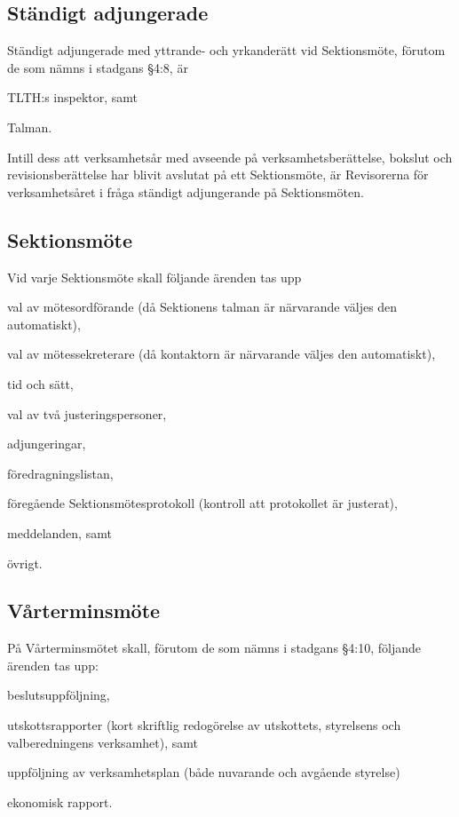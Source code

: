 \documentclass[10pt]{article}
\begin{document}
\subsection{Ständigt adjungerade}
Ständigt adjungerade med yttrande- och yrkanderätt vid Sektionsmöte,
förutom de som nämns i stadgans §4:8, är

\begin{alphlist}
    \item TLTH:s inspektor, samt
    \item Talman.
\end{alphlist}

Intill dess att verksamhetsår med avseende på verksamhetsberättelse,
bokslut och revisionsberättelse har blivit avslutat på ett Sektionsmöte,
är Revisorerna för verksamhetsåret i fråga ständigt adjungerande på
Sektionsmöten.

\subsection{Sektionsmöte}
Vid varje Sektionsmöte skall följande ärenden tas upp

\begin{alphlist}
    \item val av mötesordförande (då Sektionens talman är närvarande
        väljes den automatiskt),
    \item val av mötessekreterare (då kontaktorn är närvarande väljes
        den automatiskt),
    \item tid och sätt,
    \item val av två justeringspersoner,
    \item adjungeringar,
    \item föredragningslistan,
    \item föregående Sektionsmötesprotokoll (kontroll att protokollet
        är justerat),
    \item meddelanden, samt
    \item övrigt.
\end{alphlist}

\subsection{Vårterminsmöte}
På Vårterminsmötet skall, förutom de som nämns i stadgans §4:10,
följande ärenden tas upp:
\begin{alphlist}
    \item beslutsuppföljning,
    \item utskottsrapporter (kort skriftlig redogörelse av utskottets, styrelsens och valberedningens verksamhet), samt
    \item uppföljning av verksamhetsplan (både nuvarande och avgående styrelse)
    \item ekonomisk rapport.
\end{alphlist}
\end{document}
